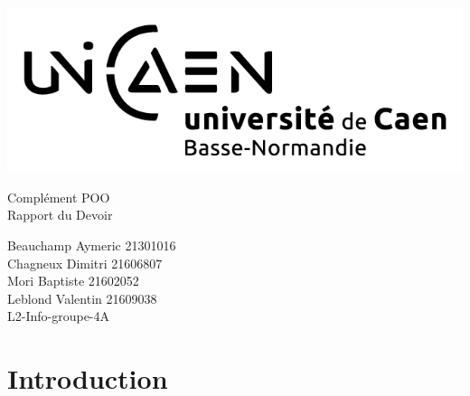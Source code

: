 \documentclass[a4paper,12pt]{article} %
\begin{document}




\begin{titlepage}

\includegraphics[scale=0.3]{images/unicaen.png}

\vspace{7cm}

\begin{center}

\begin{Huge}
Complément POO\\
Rapport du Devoir\\
\end{Huge}
\vspace{2cm}
\begin{large}
Beauchamp Aymeric 21301016\\
Chagneux Dimitri 21606807\\
Mori Baptiste 21602052\\
Leblond Valentin 21609038\\
\vspace{1cm}
L2-Info-groupe-4A
\end{large}

\end{center}
\end{titlepage}



\newpage

\tableofcontents{}

\newpage



\section*{Introduction}
\end{document}
